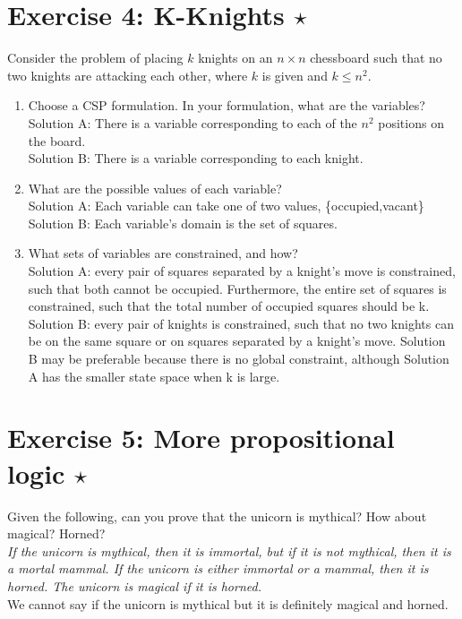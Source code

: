 \documentclass[9pt,a4paper]{extarticle}
\newenvironment{solution}
    {%
    \color{red}
    }
    { 
    \color{black}
    }
\begin{document}
 \section*{Exercise 4: K-Knights $\star$}
 Consider the problem of placing $k$ knights on an $n\times n$ chessboard such that no two knights are attacking each other, where $k$ is given and $k \leq n^2$.
 \begin{enumerate}
     \item Choose a CSP formulation. In your formulation, what are the variables?
     \begin{solution}\\
     Solution A: There is a variable corresponding to each of the $n^2$ positions on the board.\\
    Solution B: There is a variable corresponding to each knight.
     \end{solution}
     \item What are the possible values of each variable?
     \begin{solution}\\
     Solution A: Each variable can take one of two values, \{occupied,vacant\} \\
     Solution B: Each variable’s domain is the set of squares.
     \end{solution}
     \item What sets of variables are constrained, and how?
     \begin{solution}\\
     Solution A: every pair of squares separated by a knight’s move is constrained, such that both cannot be occupied. Furthermore, the entire set of squares is constrained, such that the total number of occupied squares should be k.\\
Solution B: every pair of knights is constrained, such that no two knights can be on the same square or on squares separated by a knight’s move. Solution B may be preferable because there is no global constraint, although Solution A has the smaller state space when k is large.
     \end{solution}
 \end{enumerate}
 \section*{Exercise 5: More propositional logic $\star$}
 Given the following, can you prove that the unicorn is mythical? How about magical? Horned?\\
\textit{If the unicorn is mythical, then it is immortal, but if it is not mythical, then it is a mortal mammal. If the unicorn is either immortal or a mammal, then it is horned. The unicorn is magical if it is horned.}
\begin{solution}\\
We cannot say if the unicorn is mythical but it is definitely magical and horned.
\end{solution}
\end{document}
